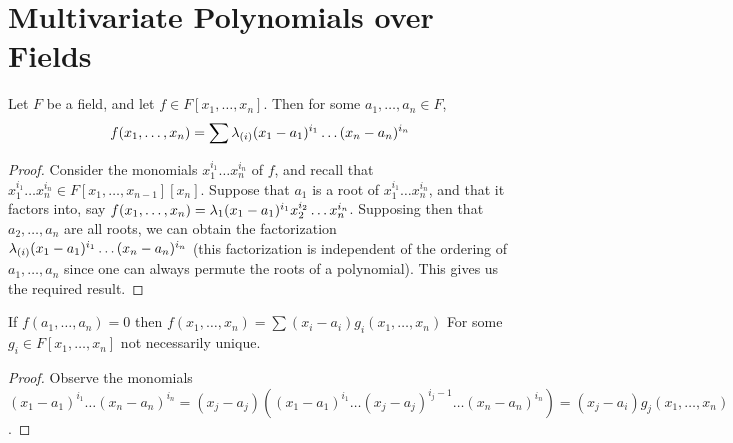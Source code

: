 \section{Multivariate Polynomials over Fields}

\begin{proposition}\label{proposition_8.8.1}
  Let $F$ be a field, and let $f \in F[x_1, \dots, x_n]$. Then for some $a_1,
  \dots, a_n \in F$,
  \begin{equation*}
    f(x_1,\dots,x_n)=\sum{\lambda_{(i)}(x_1-a_1)^{i_1} \dots (x_n-a_n)^{i_n}}
  \end{equation*}
\end{proposition}
\begin{proof}
  Consider the monomials $x_1^{i_1} \dots x_n^{i_n}$ of $f$, and recall that
  $x_1^{i_1} \dots x_n^{i_n} \in F[x_1, \dots, x_{n-1}][x_n]$. Suppose that
  $a_1$ is a root of $x_1^{i_1} \dots x_n^{i_n}$, and that it factors into,
  say $f(x_1, \dots, x_n)=\lambda_1(x_1-a_1)^{i_1} x_2^{i_2} \dots x_n^{i_n}$.
  Supposing then that $a_2, \dots, a_n$ are all roots, we can obtain the
  factorization $\lambda_{(i)}(x_1-a_1)^{i_1} \dots (x_n-a_n)^{i_n}$ (this
  factorization is independent of the ordering of $a_1, \dots, a_n$ since one
  can always permute the roots of a polynomial). This gives us the required
  result.
\end{proof}
\begin{corollary}
  If $f(a_1, \dots, a_n)=0$ then $f(x_1, \dots, x_n)=\sum{(x_i-a_i)g_i(x_1,
  \dots, x_n)}$ For some $g_i \in F[x_1, \dots, x_n]$ not necessarily unique.
\end{corollary}
\begin{proof}
  Observe the monomials $(x_1-a_1)^{i_1} \dots
  (x_n-a_n)^{i_n}=(x_j-a_j)((x_1-a_1)^{i_1} \dots (x_j-a_j)^{i_j-1} \dots
  (x_n-a_n)^{i_n})=(x_j-a_i)g_j(x_1, \dots, x_n)$.
\end{proof}

